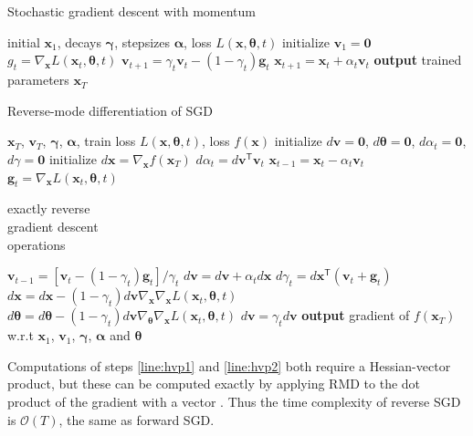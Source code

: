 \documentclass{article}
\newcommand{\vx}{\mathbf{x}}
\newcommand{\vv}{\mathbf{v}}
\newcommand{\vg}{\mathbf{g}}
\newcommand{\vzero}{\mathbf{0}}
\newcommand{\tra}{^{\mathsf{T}}}
\newcommand{\hypers}{{\boldsymbol{\theta}}}
\newcommand{\params}{\vx}
\newcommand{\decay}{\gamma}
\newcommand{\decays}{{\boldsymbol{\decay}}}
\newcommand{\stepsize}{\alpha}
\newcommand{\stepsizes}{{\boldsymbol{\stepsize}}}
\newcommand{\gradparams}{\nabla_\params L(\params_t, \hypers, t)}
\begin{document}
\begin{algorithm}
   \caption{Stochastic gradient descent with momentum}
   \label{alg:sgd}
\begin{algorithmic}[1]
    initial $\vx_1$, decays $\decays$, stepsizes $\stepsizes$, loss $L(\params, \hypers, t)$
   \State initialize $\vv_1 = \vzero$
   \State $g_t = \gradparams$ 
   \State $\vv_{t+1} = \decay_t \vv_t - (1 - \decay_t) \vg_t$   \label{step:update velocity}
   \State $\vx_{t+1} = \vx_t + \stepsize_t \vv_t$  \label{step:update position}
   \EndFor
   \State \textbf{output} trained parameters $\vx_T$
\end{algorithmic}
\end{algorithm}
%
\begin{algorithm}
   \caption{Reverse-mode differentiation of SGD}
   \label{alg:reverse-sgd}
\begin{algorithmic}[1]
    $\vx_T$, $\vv_T$, $\decays$, $\stepsizes$, train loss $L(\params, \hypers, t)$, loss $f(\params)$
   \State initialize $d\vv = \vzero$, $d\hypers = \vzero$, $d\stepsize_t = \vzero$, $d\decay = \vzero$
   \State initialize $d\vx = \nabla_\params f(\params_T)$
   \State $d\stepsize_t = d\vv\tra \vv_t$
   \State $\vx_{t-1} = \vx_t - \stepsize_t \vv_t$ \label{step:reverse-position}
   \vspace{-0.95\baselineskip}
   \State $\vg_t = \gradparams$ \label{step:reverse-gradient}
   \hfill \scalebox{1.1}{\Bigg\}} \vspace{-\baselineskip} \begin{minipage}{2.5cm} exactly reverse \\ gradient descent \\ operations \strut \end{minipage}
   \State $\vv_{t-1} = [\vv_t - (1 - \decay_t) \vg_t] / \decay_t$ \label{step:reverse-velocity}
   \State $d\vv = d\vv + \stepsize_t d\vx$
   \State $d\decay_t = d\vx\tra (\vv_t + \vg_t)$
   \State $d\vx = d\vx - (1 - \decay_t) d\vv \nabla_\params \gradparams$ \label{line:hvp1}
   \State $d\hypers = d\hypers - (1 - \decay_t) d\vv \nabla_\hypers \gradparams$ \label{line:hvp2}
   \State $d\vv = \decay_t d\vv$
   \EndFor
   \State \textbf{output} gradient of $f(\vx_T)$ w.r.t $\vx_1$, $\vv_1$, $\decays$, $\stepsizes$ and $\hypers$
\end{algorithmic}
\end{algorithm}
%
Computations of steps \ref{line:hvp1} and \ref{line:hvp2} both require a
Hessian-vector product, but these can be computed exactly by applying RMD to the
dot product of the gradient with a vector \citep{pearlmutter1994fast}.  Thus the
time complexity of reverse SGD is $\mathcal{O}(T)$, the same as forward SGD.
\end{document}
